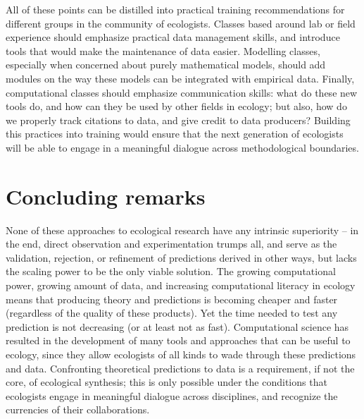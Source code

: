 \documentclass[11pt,serif]{article}
\begin{document}
\color{purple}All of these points can be distilled into practical
training recommendations for\color{black} \color{purple}different groups
in the community of ecologists. Classes based around lab or\color{black}
\color{purple}field experience should emphasize practical data
management skills, and\color{black} \color{purple}introduce tools that
would make the maintenance of data easier. Modelling\color{black}
\color{purple}classes, especially when concerned about purely
mathematical models, should add\color{black} \color{purple}modules on
the way these models can be integrated with empirical data.
Finally,\color{black} \color{purple}computational classes should
emphasize communication skills: what do these new\color{black}
\color{purple}tools do, and how can they be used by other fields in
ecology; but also, how do\color{black} \color{purple}we properly track
citations to data, and give credit to data producers?
Building\color{black} \color{purple}this practices into training would
ensure that the next generation of ecologists\color{black}
\color{purple}will be able to engage in a meaningful dialogue across
methodological\color{black} boundaries.

\section{Concluding remarks}\label{concluding-remarks}

None of these approaches to ecological research have any intrinsic
superiority -- in the end, direct observation and experimentation trumps
all, and serve as the validation, rejection, or refinement of
predictions derived in other ways, but lacks the scaling power to be the
only viable solution. The growing computational power, growing amount of
data, and increasing computational literacy in ecology means that
producing theory and predictions is becoming cheaper and faster
(regardless of the quality of these products). Yet the time needed to
test any prediction is not decreasing (or at least not as fast).
Computational science has resulted in the development of many tools and
approaches that can be useful to ecology, since they allow ecologists of
all kinds to wade through these predictions and data. Confronting
theoretical predictions to data is a requirement, if not the core, of
ecological synthesis; this is only possible under the conditions that
ecologists engage in meaningful dialogue across disciplines, and
recognize the currencies of their collaborations.
\end{document}
